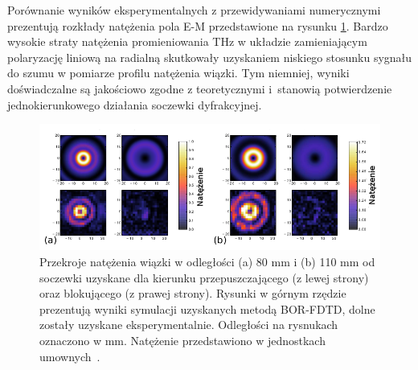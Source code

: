 Porównanie wyników eksperymentalnych z przewidywaniami numerycznymi prezentują rozkłady natężenia pola E-M przedstawione na rysunku \ref{fig:eksp-por}. Bardzo wysokie straty natężenia promieniowania THz w układzie zamieniającym polaryzację liniową na radialną skutkowały uzyskaniem niskiego stosunku sygnału do szumu w pomiarze profilu natężenia wiązki. Tym niemniej, wyniki doświadczalne są jakościowo zgodne z teoretycznymi i~stanowią potwierdzenie jednokierunkowego działania soczewki dyfrakcyjnej.

\begin{figure}[htb]
	\includegraphics[width=\textwidth]{images/thz/exp-express.png}
	\caption{Przekroje natężenia wiązki w odległości (a) 80 mm i (b) 110 mm od soczewki uzyskane dla kierunku przepuszczającego (z lewej strony) oraz blokującego (z prawej strony). Rysunki w górnym rzędzie prezentują wyniki symulacji uzyskanych metodą BOR-FDTD, dolne zostały uzyskane eksperymentalnie. Odległości na rysnukach oznaczono w mm. Natężenie przedstawiono w jednostkach umownych~\cite{Yavorskiy:14}.}
	\label{fig:eksp-por}
\end{figure}
